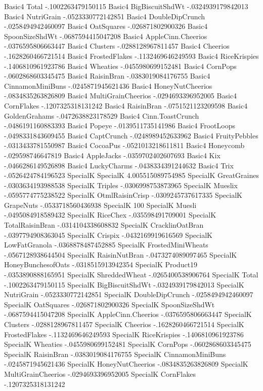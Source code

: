 Basic4	Total	-.1002263479150115
Basic4	BigBiscuitShdWt	-.0324939179842013
Basic4	NutriGrain	-.0523330772142851
Basic4	DoubleDipCrunch	-.0258494942460097
Basic4	OatSquares	-.026871802900326
Basic4	SpoonSizeShdWt	-.0687594415047208
Basic4	AppleCinn.Cheerios	-.0376595806663447
Basic4	Clusters	-.0288128967811457
Basic4	Cheerios	-.1628260466721514
Basic4	FrostedFlakes	-.1132469646249593
Basic4	RiceKrispies	-.1406810961923786
Basic4	Wheaties	-.0455980699152481
Basic4	CornPops	-.0602868603345475
Basic4	RaisinBran	-.0383019084176755
Basic4	CinnamonMiniBuns	-.0245871945621436
Basic4	HoneyNutCheerios	-.0834835263826809
Basic4	MultiGrainCheerios	-.0294693396952005
Basic4	CornFlakes	-.1207325318131242
Basic4	RaisinBran	-.0751521123209598
Basic4	GoldenGrahams	-.0472638823178529
Basic4	Cinn.ToastCrunch	-.0486191160883393
Basic4	Popeye	-.0139511735141986
Basic4	FrootLoops	-.0498331843609455
Basic4	CaptCrunch	-.0248989452633962
Basic4	FruityPebbles	-.0313433781550987
Basic4	CocoaPus	-.0521013218611811
Basic4	Honeycomb	-.029598746647819
Basic4	AppleJacks	-.0359702402607693
Basic4	Kix	-.0466286149526898
Basic4	LuckyCharms	-.0438334391244632
Basic4	Trix	-.0526424784196523
SpecialK	SpecialK	4.005515089754985
SpecialK	GreatGraines	-.0303634193988538
SpecialK	Triples	-.0306998753873965
SpecialK	Mueslix	-.0595774775238522
SpecialK	OtmlRaisinCrisp	-.0309245737617335
SpecialK	GrapeNuts	-.0533718560436938
SpecialK	100%
SpecialK	Muesli	-.0495084918589432
SpecialK	RiceChex	-.035598491709001
SpecialK	TotalRaisinBran	-.0314104338608832
SpecialK	CracklinOatBran	-.0397794908363045
SpecialK	Crispix	-.0432169919616569
SpecialK	LowFatGranola	-.0368878487452885
SpecialK	FrostedMiniWheats	-.0567128938644504
SpecialK	RaisinNutBran	-.0473274089097465
SpecialK	HoneyBunchesofOats	-.0318515913942354
SpecialK	Product19	-.0353890888165951
SpecialK	ShreddedWheat	-.0265400538906764
SpecialK	Total	-.1002263479150115
SpecialK	BigBiscuitShdWt	-.0324939179842013
SpecialK	NutriGrain	-.0523330772142851
SpecialK	DoubleDipCrunch	-.0258494942460097
SpecialK	OatSquares	-.026871802900326
SpecialK	SpoonSizeShdWt	-.0687594415047208
SpecialK	AppleCinn.Cheerios	-.0376595806663447
SpecialK	Clusters	-.0288128967811457
SpecialK	Cheerios	-.1628260466721514
SpecialK	FrostedFlakes	-.1132469646249593
SpecialK	RiceKrispies	-.1406810961923786
SpecialK	Wheaties	-.0455980699152481
SpecialK	CornPops	-.0602868603345475
SpecialK	RaisinBran	-.0383019084176755
SpecialK	CinnamonMiniBuns	-.0245871945621436
SpecialK	HoneyNutCheerios	-.0834835263826809
SpecialK	MultiGrainCheerios	-.0294693396952005
SpecialK	CornFlakes	-.1207325318131242
